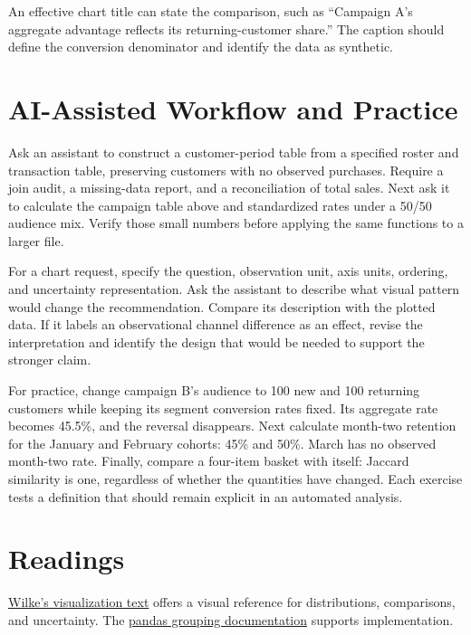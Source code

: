 An effective chart title can state the comparison, such as ``Campaign
A's aggregate advantage reflects its returning-customer share.'' The
caption should define the conversion denominator and identify the data
as synthetic.

\hypertarget{M02-ai-assisted-workflow-and-practice}{%
\section{AI-Assisted Workflow and
Practice}\label{M02-ai-assisted-workflow-and-practice}}

\noindent Ask an assistant to construct a customer-period table from a specified
roster and transaction table, preserving customers with no observed
purchases. Require a join audit, a missing-data report, and a
reconciliation of total sales. Next ask it to calculate the campaign
table above and standardized rates under a 50/50 audience mix. Verify
those small numbers before applying the same functions to a larger file.

For a chart request, specify the question, observation unit, axis units,
ordering, and uncertainty representation. Ask the assistant to describe
what visual pattern would change the recommendation. Compare its
description with the plotted data. If it labels an observational channel
difference as an effect, revise the interpretation and identify the
design that would be needed to support the stronger claim.

For practice, change campaign B's audience to 100 new and 100 returning
customers while keeping its segment conversion rates fixed. Its
aggregate rate becomes 45.5\%, and the reversal disappears. Next
calculate month-two retention for the January and February cohorts: 45\%
and 50\%. March has no observed month-two rate. Finally, compare a
four-item basket with itself: Jaccard similarity is one, regardless of
whether the quantities have changed. Each exercise tests a definition
that should remain explicit in an automated analysis.

\hypertarget{M02-readings}{%
\section{Readings}\label{M02-readings}}

\noindent \href{https://clauswilke.com/dataviz/}{Wilke's visualization text}
offers a visual reference for distributions, comparisons, and
uncertainty. The
\href{https://pandas.pydata.org/docs/user_guide/groupby.html}{pandas
grouping documentation} supports implementation.

